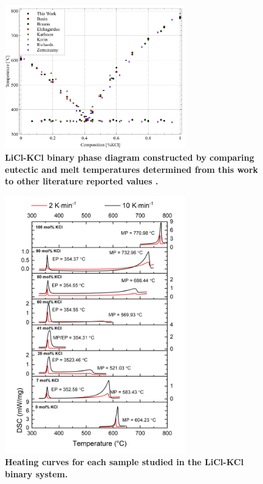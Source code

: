 \documentclass[review]{elsarticle}
\providecommand{\DIFaddtex}[1]{{\bf #1}} %
\providecommand{\DIFaddFL}[1]{\DIFadd{#1}} %
\providecommand{\DIFadd}[1]{\texorpdfstring{\DIFaddtex{#1}}{#1}} %
\begin{document}
\begin{figure}[h]
 \centering
 \includegraphics[width=0.7\textwidth]{images/DSC analysis.jpg} 
 \caption{\DIFaddFL{LiCl-KCl binary phase diagram constructed by comparing eutectic and melt temperatures determined from this work to other literature reported values \cite{RN79,RN78,RN77,RN76,RN75,RN16}.}}
 \label{fig:figureDSC}
\end{figure}

 

\begin{figure}[]
 \centering
 \includegraphics[width=0.7\textwidth]{images/DSCheatcurves.jpg} 
 \caption{\DIFaddFL{Heating curves for each sample studied in the LiCl-KCl binary system. }}
 \label{fig:figureDSC2}
\end{figure}
\end{document}
